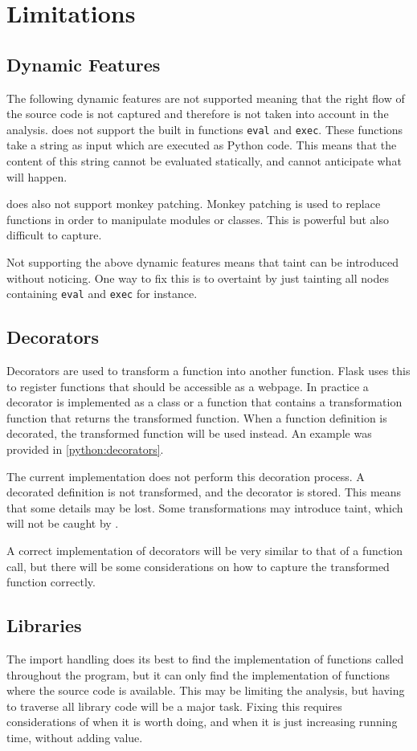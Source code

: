 \section{Limitations}
\subsection{Dynamic Features}
The following dynamic features are not supported meaning that the right flow of the source code is not captured and therefore is not taken into account in the analysis.
\pyt{} does not support the built in functions \texttt{eval} and \texttt{exec}.
These functions take a string as input which are executed as Python code.
This means that the content of this string cannot be evaluated statically, and \pyt{} cannot anticipate what will happen.

\pyt{} does also not support monkey patching.
Monkey patching is used to replace functions in order to manipulate modules or classes.
This is powerful but also difficult to capture.

Not supporting the above dynamic features means that taint can be introduced without \pyt{} noticing.
One way to fix this is to overtaint by just tainting all nodes containing \texttt{eval} and \texttt{exec} for instance.

\subsection{Decorators}
Decorators are used to transform a function into another function.
Flask uses this to register functions that should be accessible as a webpage.
In practice a decorator is implemented as a class or a function that contains a transformation function that returns the transformed function.
When a function definition is decorated, the transformed function will be used instead.
An example was provided in \cref{python:decorators}.

The current implementation does not perform this decoration process.
A decorated definition is not transformed, and the decorator is stored.
This means that some details may be lost.
Some transformations may introduce taint, which will not be caught by \pyt{}.

A correct implementation of decorators will be very similar to that of a function call, but there will be some considerations on how to capture the transformed function correctly.

\subsection{Libraries}
The import handling does its best to find the implementation of functions called throughout the program, but it can only find the implementation of functions where the source code is available.
This may be limiting the analysis, but having to traverse all library code will be a major task.
Fixing this requires considerations of when it is worth doing, and when it is just increasing running time, without adding value.

